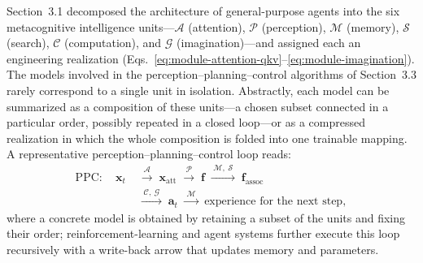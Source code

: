 \documentclass[12pt,a4paper]{article}
\newcommand{\Attn}{\mathcal{A}}
\newcommand{\Per}{\mathcal{P}}
\newcommand{\Mem}{\mathcal{M}}
\newcommand{\Srch}{\mathcal{S}}
\newcommand{\Comp}{\mathcal{C}}
\newcommand{\Imag}{\mathcal{G}}
\begin{document}
Section~3.1 decomposed the architecture of general-purpose agents into the six metacognitive intelligence units---$\Attn$ (attention), $\Per$ (perception), $\Mem$ (memory), $\Srch$ (search), $\Comp$ (computation), and $\Imag$ (imagination)---and assigned each an engineering realization (Eqs.~\eqref{eq:module-attention-qkv}--\eqref{eq:module-imagination}). The models involved in the perception--planning--control algorithms of Section~3.3 rarely correspond to a single unit in isolation. Abstractly, each model can be summarized as a composition of these units---a chosen subset connected in a particular order, possibly repeated in a closed loop---or as a compressed realization in which the whole composition is folded into one trainable mapping. A representative perception--planning--control loop reads:
\begin{equation}
\begin{split}
\mathrm{PPC}:\quad \mathbf{x}_{t}
&\;\xrightarrow{\;\Attn\;}\;\mathbf{x}_{\mathrm{att}}
\;\xrightarrow{\;\Per\;}\;\mathbf{f}
\;\xrightarrow{\;\Mem,\ \Srch\;}\;\mathbf{f}_{\mathrm{assoc}}\\
&\;\xrightarrow{\;\Comp,\ \Imag\;}\;\mathbf{a}_{t}
\;\xrightarrow{\;\Mem\;}\;\text{experience for the next step},
\end{split}
\label{eq:summary-ppc-loop}
\end{equation}
where a concrete model is obtained by retaining a subset of the units and fixing their order; reinforcement-learning and agent systems further execute this loop recursively with a write-back arrow that updates memory and parameters.
\end{document}
